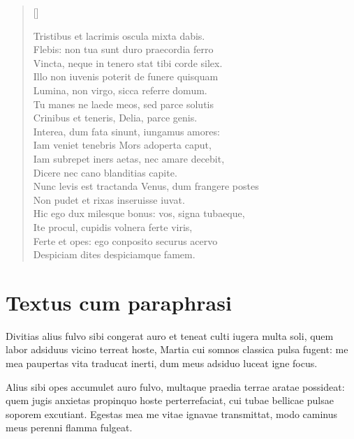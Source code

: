 \begin{verse}[\versewidth]
\begin{altverse}
{Tristibus et lacrimis oscula mixta dabis.\\
Flebis: non tua sunt duro praecordia ferro\\
Vincta, neque in tenero stat tibi corde silex.\\
Illo non iuvenis poterit de funere quisquam\\
Lumina, non virgo, sicca referre domum.\\
Tu manes ne laede meos, sed parce solutis\\
Crinibus et teneris, Delia, parce genis.\\
Interea, dum fata sinunt, iungamus amores:\\
Iam veniet tenebris Mors adoperta caput,\\
Iam subrepet iners aetas, nec amare decebit,\\
Dicere nec cano blanditias capite.\\
Nunc levis est tractanda Venus, dum frangere postes\\
Non pudet et rixas inseruisse iuvat.\\
Hic ego dux milesque bonus: vos, signa tubaeque,\\
Ite procul, cupidis volnera ferte viris,\\
Ferte et opes: ego conposito securus acervo\\
Despiciam dites despiciamque famem. \\

}
\end{altverse}
\end{verse}

\newpage

\section*{Textus cum paraphrasi}

{\large

Divitias alius fulvo sibi congerat auro et teneat culti iugera multa soli, quem labor adsiduus vicino terreat hoste, Martia cui somnos classica pulsa fugent: me mea paupertas vita traducat inerti, dum meus adsiduo luceat igne focus.\\

}

\noindent Alius sibi opes accumulet auro fulvo, multaque praedia terrae aratae possideat: quem jugis anxietas propinquo hoste perterrefaciat, cui tubae bellicae pulsae soporem excutiant. Egestas mea me vitae ignavae transmittat, modo caminus meus perenni flamma fulgeat.\\



